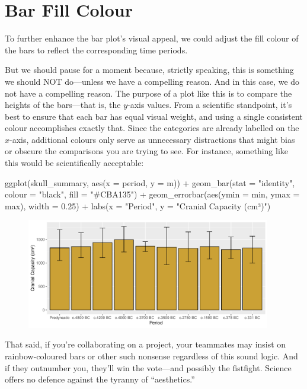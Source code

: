 \section{Bar Fill Colour}

To further enhance the bar plot's visual appeal, we could adjust the fill colour of the bars to reflect the corresponding time periods.

But we should pause for a moment because, strictly speaking, this is something we should NOT do—unless we have a compelling reason. And in this case, we do not have a compelling reason. The purpose of a plot like this is to compare the heights of the bars—that is, the $y$-axis values. From a scientific standpoint, it’s best to ensure that each bar has equal visual weight, and using a single consistent colour accomplishes exactly that. Since the categories are already labelled on the $x$-axis, additional colours only serve as unnecessary distractions that might bias or obscure the comparisons you are trying to see. For instance, something like this would be scientifically acceptable:

\begin{inRhigh}[highlightlines={2}]
ggplot(skull_summary, aes(x = period, y = m)) +
  geom_bar(stat = "identity", colour = "black", fill = "#CBA135") +
  geom_errorbar(aes(ymin = min, ymax = max), width = 0.25) +
  labs(x = "Period", y = "Cranial Capacity (cm³)")
\end{inRhigh}

\vspace{2em}

\begin{figure}[H]
\includegraphics[width = 0.95\textwidth]{graphics/ch3Figs/bar_5.pdf}
\end{figure}

That said, if you’re collaborating on a project, your teammates may insist on rainbow-coloured bars or other such nonsense regardless of this sound logic. And if they outnumber you, they’ll win the vote—and possibly the fistfight. Science offers no defence against the tyranny of \mbox{``aesthetics.''}

